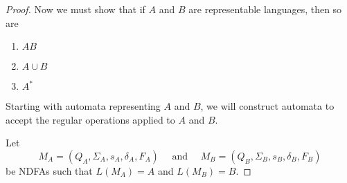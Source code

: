 \documentclass{bcthesis}
\begin{document}
\begin{proof}
		Now we must show that if $A$ and $B$ are representable languages, then so are
		\begin{enumerate}[label=(\roman*), itemsep = -0.3 ex, nolistsep]
			\item $AB$
			\item $A \cup B$
			\item $A^*$
		\end{enumerate}
		Starting with automata representing $A$ and $B$, we will construct automata to accept the regular operations applied to $A$ and $B$.

			\newcommand{\ma}{\ensuremath{M_A}\xspace}
				\newcommand{\qa}{\ensuremath{Q_A}\xspace}
				\newcommand{\siga}{\ensuremath{\Sigma_A}\xspace}
				\newcommand{\sa}{\ensuremath{s_A}\xspace}
				\newcommand{\dala}{\ensuremath{\delta_A}\xspace}
				\newcommand{\fa}{\ensuremath{F_A}\xspace}

			\newcommand{\mb}{\ensuremath{M_B}\xspace}
				\newcommand{\qb}{\ensuremath{Q_B}\xspace}
				\newcommand{\sigb}{\ensuremath{\Sigma_B}\xspace}
				\renewcommand{\sb}{\ensuremath{s_B}\xspace}
				\newcommand{\dalb}{\ensuremath{\delta_B}\xspace}
				\newcommand{\fb}{\ensuremath{F_B}\xspace}

			\newcommand{\mab}{\ensuremath{M_{AB}}\xspace}
				\newcommand{\qab}{\ensuremath{Q_{AB}}\xspace}
				\newcommand{\sigab}{\ensuremath{\Sigma_{AB}}\xspace}
				\newcommand{\sab}{\ensuremath{s_{AB}}\xspace}
				\newcommand{\dalab}{\ensuremath{\delta_{AB}}\xspace}
				\newcommand{\fab}{\ensuremath{F_{AB}}\xspace}

			\newcommand{\maub}{\ensuremath{M_{\cup}}\xspace}
				\newcommand{\qaub}{\ensuremath{Q_{\cup}}\xspace}
				\newcommand{\sigaub}{\ensuremath{\Sigma_{\cup}}\xspace}
				\newcommand{\saub}{\ensuremath{s_{\cup}}\xspace}
				\newcommand{\dalaub}{\ensuremath{\delta_{\cup}}\xspace}
				\newcommand{\faub}{\ensuremath{F_{\cup}}\xspace}

			\newcommand{\mas}{\ensuremath{M_{A^*}}\xspace}
				\newcommand{\qas}{\ensuremath{Q_{A^*}}\xspace}
				\newcommand{\sigas}{\ensuremath{\Sigma_{A^*}}\xspace}
				\newcommand{\sas}{\ensuremath{s_{A^*}}\xspace}
				\newcommand{\dalas}{\ensuremath{\delta_{A^*}}\xspace}
				\newcommand{\fas}{\ensuremath{F_{A^*}}\xspace}




		Let 
		\[
			M_A = (Q_A, \Sigma_A, s_A, \delta_A, F_A) \quad \text{ and } \quad M_B = (Q_B, \Sigma_B, s_B, \delta_B, F_B)
		\]
		be NDFAs such that $L(\ma) = A$ and $L(\mb) = B$.


\end{proof}
\end{document}
